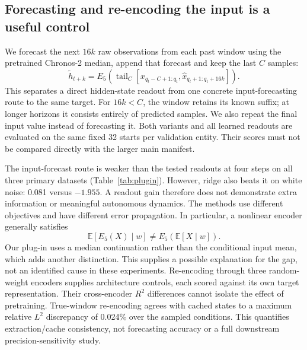 \documentclass[10pt,a4paper,twocolumn]{article}
\begin{document}
\subsection{Forecasting and re-encoding the input is a useful control}
We forecast the next $16k$ raw observations from each past window using the pretrained Chronos-2 median, append that forecast and keep the last $C$ samples:
\begin{equation}
 \widetilde h_{t+k}=E_5\!\left(\operatorname{tail}_{C}
 [x_{q_t-C+1:q_t},\widehat x_{q_t+1:q_t+16k}]\right).
\end{equation}
This separates a direct hidden-state readout from one concrete input-forecasting route to the same target.
For $16k<C$, the window retains its known suffix; at longer horizons it consists entirely of predicted samples.
We also repeat the final input value instead of forecasting it.
Both variants and all learned readouts are evaluated on the same fixed 32 starts per validation entity.
Their scores must not be compared directly with the larger main manifest.

\begin{table}[t]
\centering\small
\setlength{\tabcolsep}{3pt}

\caption{Four-step validation $R^2$ on the re-encoding subset. Chronos and Last value first continue the raw input and then encode the resulting window. Readouts use exactly the same starts and targets. White noise has two validation entities; no MLP is fitted for this added null check.}
\label{tab:plugin}
\end{table}

The input-forecast route is weaker than the tested readouts at four steps on all three primary datasets (Table~\ref{tab:plugin}).
However, ridge also beats it on white noise: 0.081 versus $-1.955$.
A readout gain therefore does not demonstrate extra information or meaningful autonomous dynamics.
The methods use different objectives and have different error propagation.
In particular, a nonlinear encoder generally satisfies
\begin{equation}
 \mathbb E[E_5(X)\mid w]\ne E_5(\mathbb E[X\mid w]).
\end{equation}
Our plug-in uses a median continuation rather than the conditional input mean, which adds another distinction.
This supplies a possible explanation for the gap, not an identified cause in these experiments.
Re-encoding through three random-weight encoders supplies architecture controls, each scored against its own target representation.
Their cross-encoder $R^2$ differences cannot isolate the effect of pretraining.
True-window re-encoding agrees with cached states to a maximum relative $L^2$ discrepancy of 0.024\% over the sampled conditions.
This quantifies extraction/cache consistency, not forecasting accuracy or a full downstream precision-sensitivity study.
\end{document}
